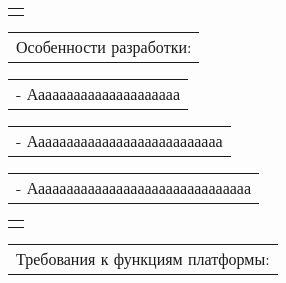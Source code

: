 \documentclass[12pt, А4, twoside]{article}
\begin{document}
\begin{FlushLeft}
    \begin{tabular}{p{17.25cm}}
        \vspace{0pt} \hline \\
    \end{tabular}

    \vspace{-0.1 cm}

    \begin{tabular}{p{17.25cm}}
        \hspace{0.3cm} \textsf{Особенности разработки:} \vspace{0pt} \hline \\
    \end{tabular}

    \vspace{-0.1 cm}

    \begin{tabular}{p{17.25cm}}
        \hspace{0.6cm} \textsf{- Ааааааааааааааааааааа} \vspace{0pt} \hline \\
    \end{tabular}

    \vspace{-0.1 cm}

    \begin{tabular}{p{17.25cm}}
        \hspace{0.6cm} \textsf{- Ааааааааааааааааааааааааааа}\vspace{0pt} \hline \\
    \end{tabular}

    \vspace{-0.1 cm}

    \begin{tabular}{p{17.25cm}}
        \hspace{0.6cm} \textsf{- Ааааааааааааааааааааааааааааааа}\vspace{0pt} \hline 
    \end{tabular}

    \begin{tabular}{p{17.25cm}}
        \vspace{0pt} \hline \\
    \end{tabular}

    \vspace{-0.1 cm}

    \begin{tabular}{p{17.25cm}}
        \hspace{0.3cm} \textsf{Требования к функциям платформы:} \vspace{0pt} \hline \\
    \end{tabular}


\end{FlushLeft}
\end{document}
